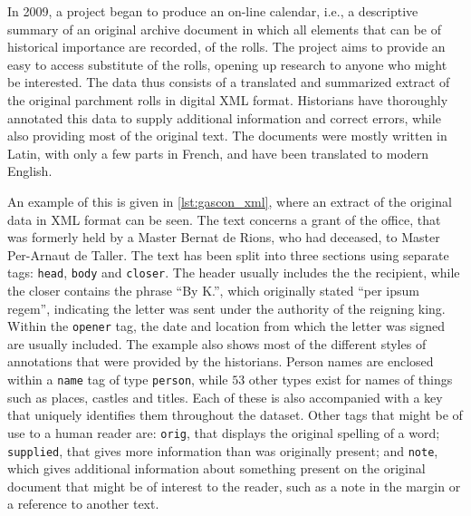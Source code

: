 
In 2009, a project began to produce an on-line calendar, i.e., a descriptive summary of an original archive document in which all elements that can be of historical importance are recorded, of the rolls.
The project aims to provide an easy to access substitute of the rolls, opening up research to anyone who might be interested.
The data thus consists of a translated and summarized extract of the original parchment rolls in digital XML format.
Historians have thoroughly annotated this data to supply additional information and correct errors, while also providing most of the original text.
The documents were mostly written in Latin, with only a few parts in French, and have been translated to modern English.

An example of this is given in \cref{lst:gascon_xml}, where an extract of the original data in XML format can be seen.
The text concerns a grant of the office, that was formerly held by a Master Bernat de Rions, who had deceased, to Master Per-Arnaut de Taller.
The text has been split into three sections using separate tags: \texttt{head}, \texttt{body} and \texttt{closer}.
The header usually includes the the recipient, while the closer contains the phrase ``By K.'', which originally stated ``per ipsum regem'', indicating the letter was sent under the authority of the reigning king.
Within the \texttt{opener} tag, the date and location from which the letter was signed are usually included.
The example also shows most of the different styles of annotations that were provided by the historians.
Person names are enclosed within a \texttt{name} tag of type \texttt{person}, while $53$ other types exist for names of things such as places, castles and titles.
Each of these is also accompanied with a key that uniquely identifies them throughout the dataset.
Other tags that might be of use to a human reader are: \texttt{orig}, that displays the original spelling of a word; \texttt{supplied}, that gives more information than was originally present; and \texttt{note}, which gives additional information about something present on the original document that might be of interest to the reader, such as a note in the margin or a reference to another text.

